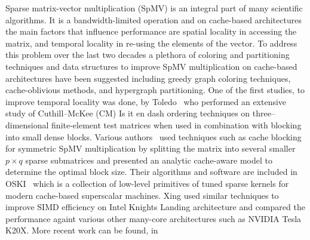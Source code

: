 


Sparse matrix-vector multiplication (SpMV) is an integral part of many scientific algorithms. It is a bandwidth-limited operation and on cache-based architectures the main factors that influence performance are spatial locality in accessing the matrix, and temporal locality in re-using the elements of the vector. To address this problem over the last two decades a plethora of coloring and partitioning techniques and data structures to improve SpMV multiplication on cache-based architectures have been suggested including greedy graph coloring techniques, cache-oblivious methods, and hypergraph partitioning. One of the first studies, \eg to improve temporal locality was done, \eg by Toledo~\cite{Toledo:1997:IMP:279511.279532} who performed an extensive study of Cuthill--McKee (CM) {\CA Is it en dash } ordering techniques on three--dimensional finite-element test matrices when used in combination with blocking into small dense blocks. Various authors~\cite{Buluc:2011:RMA:2058524.2059503,Williams:2009:OSM:1513001.1513318,doi:10.1177/1094342004041296} used techniques such as cache blocking for symmetric SpMV multiplication by splitting the matrix into several smaller $p \times q$ sparse submatrices and presented an analytic cache-aware model to determine the optimal block size. Their algorithms and software are included in OSKI~\cite{1742-6596-16-1-071} which is a collection of low-level primitives of tuned sparse kernels for modern cache-based superscalar machines. Xing \etal \cite{Liu:2013:ESM:2464996.2465013} used similar techniques to improve SIMD efficiency on Intel Knights Landing architecture
and compared the performance againt various other many-core architectures such as NVIDIA Tesla K20X. More recent work can be found, \eg in~\cite{Buluc:2011:RMA:2058524.2059503,Liu:2015:CES:2751205.2751209}

